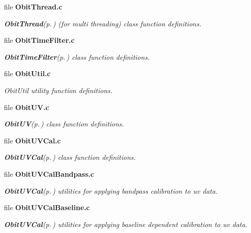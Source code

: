 \begin{CompactItemize}
\item 
file {\bf Obit\-Thread.c}
\begin{CompactList}\small\item\em {\bf Obit\-Thread}{\rm (p.\,\pageref{structObitThread})} (for multi threading) class function definitions. \item\end{CompactList}

\item 
file {\bf Obit\-Time\-Filter.c}
\begin{CompactList}\small\item\em {\bf Obit\-Time\-Filter}{\rm (p.\,\pageref{structObitTimeFilter})} class function definitions. \item\end{CompactList}

\item 
file {\bf Obit\-Util.c}
\begin{CompactList}\small\item\em Obit\-Util utility function definitions. \item\end{CompactList}

\item 
file {\bf Obit\-UV.c}
\begin{CompactList}\small\item\em {\bf Obit\-UV}{\rm (p.\,\pageref{structObitUV})} class function definitions. \item\end{CompactList}

\item 
file {\bf Obit\-UVCal.c}
\begin{CompactList}\small\item\em {\bf Obit\-UVCal}{\rm (p.\,\pageref{structObitUVCal})} class function definitions. \item\end{CompactList}

\item 
file {\bf Obit\-UVCal\-Bandpass.c}
\begin{CompactList}\small\item\em {\bf Obit\-UVCal}{\rm (p.\,\pageref{structObitUVCal})} utilities for applying bandpass calibration to uv data. \item\end{CompactList}

\item 
file {\bf Obit\-UVCal\-Baseline.c}
\begin{CompactList}\small\item\em {\bf Obit\-UVCal}{\rm (p.\,\pageref{structObitUVCal})} utilities for applying baseline dependent calibration to uv data. \item\end{CompactList}


\end{CompactItemize}

